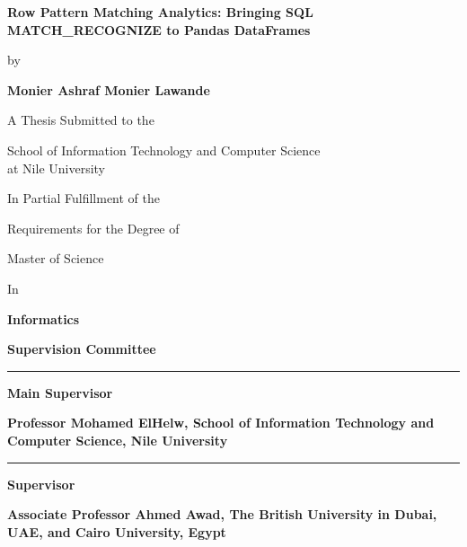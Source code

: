 \thispagestyle{empty}
\begingroup
\singlespacing
\vspace*{-\dimexpr\headheight+\headsep\relax}
\vspace*{-38bp}
\begin{center}
\fontsize{14}{24}\selectfont
\textbf{Row Pattern Matching Analytics: Bringing SQL
MATCH\_RECOGNIZE to Pandas DataFrames}\par
by\par
\textbf{Monier Ashraf Monier Lawande}\par
A Thesis Submitted to the\par
School of Information Technology and Computer Science\\
at Nile University\par
In Partial Fulfillment of the\par
Requirements for the Degree of\par
Master of Science\par
In\par
\textbf{Informatics}\par
\end{center}

\fontsize{14}{16}\selectfont
\noindent\textbf{Supervision Committee}

\vspace{16bp}
\begingroup\raggedright
\noindent\rule{0.38\textwidth}{0.4pt}\par
\noindent\textbf{Main Supervisor}\par
\noindent\textbf{Professor Mohamed ElHelw, School of Information Technology
and Computer Science, Nile University}\par
\vspace{16bp}
\noindent\rule{0.38\textwidth}{0.4pt}\par
\noindent\textbf{Supervisor}\par
\noindent\textbf{Associate Professor Ahmed Awad, The British University in
Dubai, UAE, and Cairo University, Egypt}\par
\endgroup
\endgroup
